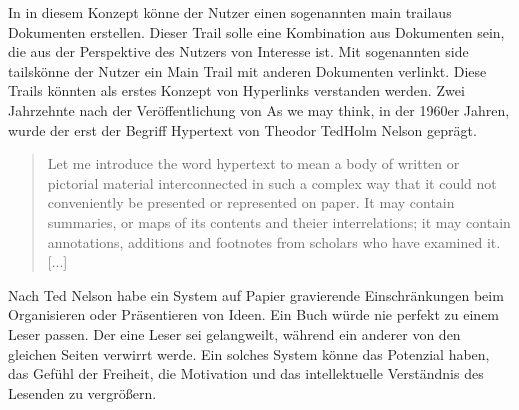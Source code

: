 In in diesem Konzept könne der Nutzer einen sogenannten \glqq main trail\grqq{ }aus Dokumenten erstellen. Dieser Trail solle eine Kombination aus Dokumenten sein, die aus der Perspektive des Nutzers von Interesse ist. Mit sogenannten \glqq side tails\grqq{ }könne der Nutzer ein Main Trail mit anderen Dokumenten \glqq verlinkt\grqq{ }\cite[Section 7]{Bush1945}. Diese Trails könnten als erstes Konzept von Hyperlinks verstanden werden. Zwei Jahrzehnte nach der Veröffentlichung von \glqq As we may think\grqq{ }, in der 1960er Jahren, wurde der erst der Begriff Hypertext von Theodor \glqq Ted\grqq{ }Holm Nelson geprägt. 

\begin{quote}
	\glqq Let me introduce the word hypertext to mean a body of written or pictorial material interconnected in such a complex way that it could not conveniently be presented or represented on paper. It may contain summaries, or maps of its contents and theier interrelations; it may contain annotations, additions and footnotes from scholars who have examined it. [...]\grqq{ }\cite{Nelson1965}
\end{quote}

Nach Ted Nelson habe ein System auf Papier gravierende Einschränkungen beim Organisieren oder Präsentieren von Ideen. Ein Buch würde nie perfekt zu einem Leser passen. Der eine Leser sei gelangweilt, während ein anderer von den gleichen Seiten verwirrt werde. \glqq Ein solches System könne das Potenzial haben, das Gefühl der Freiheit, die Motivation und das intellektuelle Verständnis des Lesenden zu vergrößern\grqq{ }\cite{Nelson1965}. 

